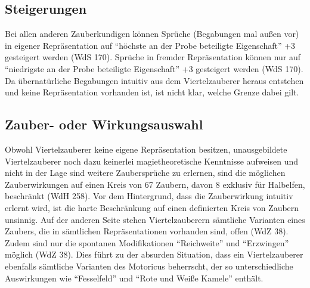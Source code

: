 \subsection{Steigerungen}
Bei allen anderen Zauberkundigen können Sprüche (Begabungen mal außen vor) in eigener Repräsentation auf \enquote{höchste an der Probe beteiligte Eigenschaft} +3 gesteigert werden (WdS 170). Sprüche in fremder Repräsentation können nur auf \enquote{niedrigste an der Probe beteiligte Eigenschaft} +3 gesteigert werden (WdS 170). Da übernatürliche Begabungen intuitiv aus dem Viertelzauberer heraus entstehen und keine Repräsentation vorhanden ist, ist nicht klar, welche Grenze dabei gilt.

\subsection{Zauber- oder Wirkungsauswahl}
Obwohl Viertelzauberer keine eigene Repräsentation besitzen, unausgebildete Viertelzauberer noch dazu keinerlei magietheoretische Kenntnisse aufweisen und nicht in der Lage sind weitere Zaubersprüche zu erlernen, sind die möglichen Zauberwirkungen auf einen Kreis von 67 Zaubern, davon 8 exklusiv für Halbelfen, beschränkt (WdH 258). Vor dem Hintergrund, dass die Zauberwirkung intuitiv erlernt wird, ist die harte Beschränkung auf einen definierten Kreis von Zaubern unsinnig. Auf der anderen Seite stehen Viertelzauberern sämtliche Varianten eines Zaubers, die in sämtlichen Repräsentationen vorhanden sind, offen (WdZ 38). Zudem sind nur die spontanen Modifikationen \enquote{Reichweite} und \enquote{Erzwingen} möglich (WdZ 38). Dies führt zu der absurden Situation, dass ein Viertelzauberer ebenfalls sämtliche Varianten des Motoricus beherrscht, der so unterschiedliche Auswirkungen wie \enquote{Fesselfeld} und \enquote{Rote und Weiße Kamele} enthält.
